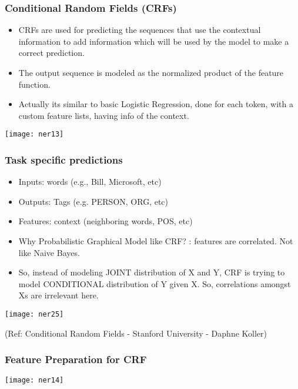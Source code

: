 \begin{frame}[fragile]\frametitle{Conditional Random Fields (CRFs)}
  \begin{itemize}
  \item CRFs are used for predicting the sequences that use the contextual information to add information which will be used by the model to make a correct prediction.
	\item The output sequence is modeled as the normalized product of the feature function.
	\item Actually its similar to basic Logistic Regression, done for each token, with a custom feature lists, having info of the context.
  \end{itemize}
	
\begin{center}
\texttt{[image: ner13]}
\end{center}
\end{frame}

\begin{frame}[fragile]\frametitle{Task specific predictions}
  \begin{itemize}
  \item Inputs: words (e.g., Bill, Microsoft, etc)
	\item Outputs: Tags (e.g. PERSON, ORG, etc)
	\item Features: context (neighboring words, POS, etc)
	\item Why Probabilistic Graphical Model like CRF? : features are correlated. Not like Naive Bayes.
	\item So, instead of modeling JOINT distribution of X and Y, CRF is trying to model CONDITIONAL distribution of Y given X. So, correlations amongst Xs are irrelevant here.
  \end{itemize}
	
\begin{center}
\texttt{[image: ner25]}
\end{center}


	{\tiny (Ref: Conditional Random Fields - Stanford University - Daphne Koller)}
	
	
\end{frame}

\begin{frame}[fragile]\frametitle{Feature Preparation for CRF}

\begin{center}
\texttt{[image: ner14]}
\end{center}

\end{frame}


